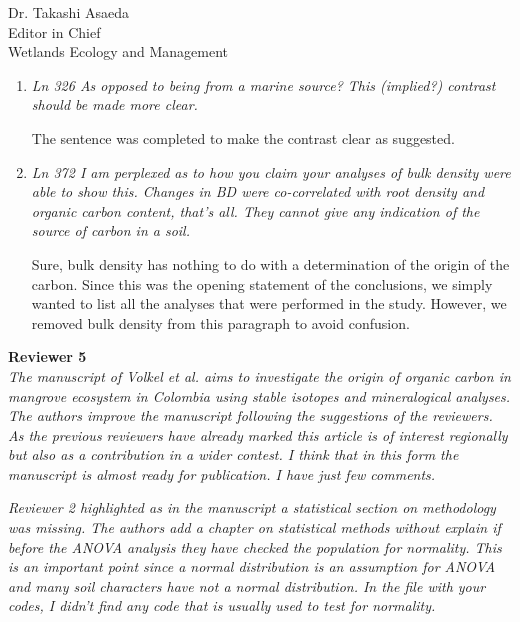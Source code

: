 \documentclass[11pt]{bgcletter}
\begin{document}
\begin{letter}{Dr. Takashi Asaeda\\
 Editor in Chief \\ Wetlands Ecology and Management}
\begin{enumerate}
{\color{blue} We beg to differ. In this paragraph we do not make any definitive statements as stated by the reviewer. When we use a word such as `likely', we are actually implying that this might be the case, but there is uncertainty. Notice that we use wording such as `this assumption is supported', `this could mean either ... or ...' , 'which would underpin', etc. These are all hedged statements that show our interpretation of the results and our favoring for a specific interpretation, but away from a definite true. \\ Despite our disagreement on this matter, we did try to change the language in several parts of the manuscript to make our statements less `definite'.}

\item {\it Ln 326 As opposed to being from a marine source? This (implied?) contrast should be made more clear.}

{\color{blue} The sentence was completed to make the contrast clear as suggested.}

\item {\it Ln 372 I am perplexed as to how you claim your analyses of bulk density were able to show this. Changes in BD were co-correlated with root density and organic carbon content, that's all. They cannot give any indication of the source of carbon in a soil.}

{\color{blue} Sure, bulk density has nothing to do with a determination of the origin of the carbon. Since this was the opening statement of the conclusions, we simply wanted to list all the analyses that were performed in the study. However, we removed bulk density from this paragraph to avoid confusion.}

\end{enumerate}

\newpage
{\bf Reviewer 5} \\

{\it The manuscript of Volkel et al. aims to investigate the origin of organic carbon in mangrove ecosystem in Colombia using stable isotopes and mineralogical analyses. The authors improve the manuscript following the suggestions of the reviewers. As the previous reviewers have already marked this article is of interest regionally but also as a contribution in a wider contest. I think that in this form the manuscript is almost ready for publication. I have just few comments.}

{\it Reviewer 2 highlighted as in the manuscript a statistical section on methodology was missing. The authors add a chapter on statistical methods without explain if before the ANOVA analysis they have checked the population for normality. This is an important point since a normal distribution is an assumption for ANOVA and many soil characters have not a normal distribution. In the file with your codes, I didn't find any code that is usually used to test for normality.}


\end{letter}
\end{document}
